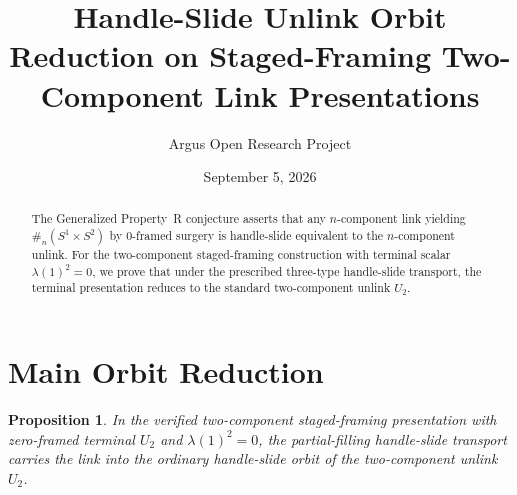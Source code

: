 \documentclass[10pt,reqno]{amsart}
\title[Staged-Framing Unlink Orbit Reduction for the Generalized Property R Conjecture]
{Handle-Slide Unlink Orbit Reduction on Staged-Framing Two-Component Link Presentations}
\author{Argus Open Research Project}
\date{September 5, 2026}
\newtheorem{proposition}[theorem]{Proposition}
\theoremstyle{definition}
\begin{document}
\begin{abstract}
The Generalized Property~R conjecture asserts that any $n$-component link yielding $\#_n(S^1\times S^2)$ by $0$-framed surgery is handle-slide equivalent to the $n$-component unlink. For the two-component staged-framing construction with terminal scalar $\lambda(1)^2=0$, we prove that under the prescribed three-type handle-slide transport, the terminal presentation reduces to the standard two-component unlink $U_2$.
\end{abstract}
\maketitle
\section{Main Orbit Reduction}
\begin{proposition}
In the verified two-component staged-framing presentation with zero-framed terminal $U_2$ and $\lambda(1)^2=0$, the partial-filling handle-slide transport carries the link into the ordinary handle-slide orbit of the two-component unlink $U_2$.
\end{proposition}
\end{document}
